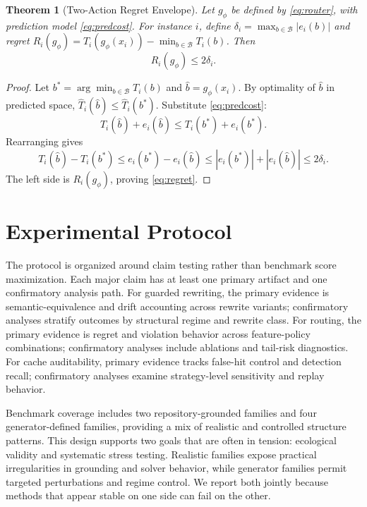 \documentclass{article} %
\newtheorem{theorem}{Theorem}[section]
\begin{document}
\begin{theorem}[Two-Action Regret Envelope]
\label{thm:regret}
Let $g_{\phi}$ be defined by \eqref{eq:router}, with prediction model \eqref{eq:predcost}. For instance $i$, define $\delta_i=\max_{b\in\mathcal{B}}|e_i(b)|$ and regret
$R_i(g_{\phi})=T_i(g_{\phi}(x_i)) - \min_{b\in\mathcal{B}}T_i(b)$. Then
\begin{equation}
\label{eq:regret}
R_i(g_{\phi})\le 2\delta_i.
\end{equation}
\end{theorem}
\begin{proof}
Let $b^*=\arg\min_{b\in\mathcal{B}} T_i(b)$ and $\widehat{b}=g_{\phi}(x_i)$. By optimality of $\widehat{b}$ in predicted space,
$\widehat{T}_i(\widehat{b})\le \widehat{T}_i(b^*)$. Substitute \eqref{eq:predcost}:
\[
T_i(\widehat{b})+e_i(\widehat{b})\le T_i(b^*)+e_i(b^*).
\]
Rearranging gives
\[
T_i(\widehat{b})-T_i(b^*)\le e_i(b^*)-e_i(\widehat{b})\le |e_i(b^*)|+|e_i(\widehat{b})|\le 2\delta_i.
\]
The left side is $R_i(g_{\phi})$, proving \eqref{eq:regret}.
\end{proof}

\section{Experimental Protocol}
\label{sec:protocol}
The protocol is organized around claim testing rather than benchmark score maximization. Each major claim has at least one primary artifact and one confirmatory analysis path. For guarded rewriting, the primary evidence is semantic-equivalence and drift accounting across rewrite variants; confirmatory analyses stratify outcomes by structural regime and rewrite class. For routing, the primary evidence is regret and violation behavior across feature-policy combinations; confirmatory analyses include ablations and tail-risk diagnostics. For cache auditability, primary evidence tracks false-hit control and detection recall; confirmatory analyses examine strategy-level sensitivity and replay behavior.

Benchmark coverage includes two repository-grounded families and four generator-defined families, providing a mix of realistic and controlled structure patterns. This design supports two goals that are often in tension: ecological validity and systematic stress testing. Realistic families expose practical irregularities in grounding and solver behavior, while generator families permit targeted perturbations and regime control. We report both jointly because methods that appear stable on one side can fail on the other.
\end{document}
